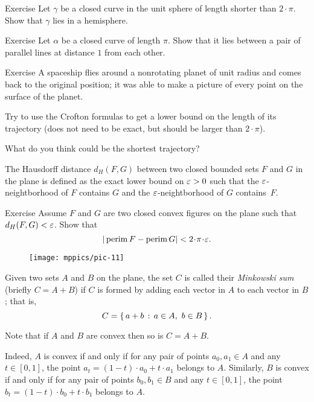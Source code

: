 \begin{thm}{Exercise}\label{ex:2pi-sphere}
Let $\gamma$ be a closed curve in the unit sphere of length shorter than $2\cdot\pi$.
Show that $\gamma$ lies in a hemisphere.
\end{thm}

\begin{thm}{Exercise} 
Let $\alpha$ be a closed curve of length $\pi$.
Show that it lies between a pair of parallel lines at distance $1$ from each other.
\end{thm}

\begin{thm}{Exercise}
A spaceship flies around a nonrotating planet of unit radius and comes back to the original position;
it was able to make a picture of every point on the surface of the planet.

Try to use the Crofton formulas to get a lower bound on the length of its trajectory (does not need to be exact, but should be larger than $2\cdot\pi$).

What do you think could be the shortest trajectory?
\end{thm}

The Hausdorff distance $d_H(F,G)$ between two closed bounded sets $F$ and $G$ in the plane is defined as the exact lower bound on $\varepsilon>0$ such that the $\varepsilon$-neightborhood of $F$ contains $G$ and the $\varepsilon$-neightborhood of $G$ contains~$F$.

\begin{thm}{Exercise}
Assume $F$ and $G$ are two closed convex figures on the plane such that $d_H(F,G)<\varepsilon$.
Show that 
\[|\perim F-\perim G|<2\cdot\pi\cdot\eps.\]

\end{thm}

\begin{wrapfigure}{r}{33 mm}
\vskip-7mm
\centering
\texttt{[image: mppics/pic-11]}
\vskip0mm
\end{wrapfigure}

Given two sets $A$ and $B$ on the plane, the set $C$ is called their \emph{Minkowski sum}  (briefly $C=A+B$) if $C$ is formed by adding each vector in $A$ to each vector in $B$;
that is, 
\[C = \left\{\,{a+b}\,:\,{a\in A,\ b\in B}\,\right\}.\]

Note that if $A$ and $B$ are convex then so is $C=A+B$. %

Indeed, $A$ is convex if and only if for any pair of points $a_0,a_1\in A$ and any $t\in[0,1]$,
the point $a_t=(1-t)\cdot a_0+t\cdot a_1$ belongs to $A$.
Similarly, $B$ is convex if and only if for any pair of points $b_0,b_1\in B$ and any $t\in[0,1]$,
the point $b_t=(1-t)\cdot b_0+t\cdot b_1$ belongs to $A$.

